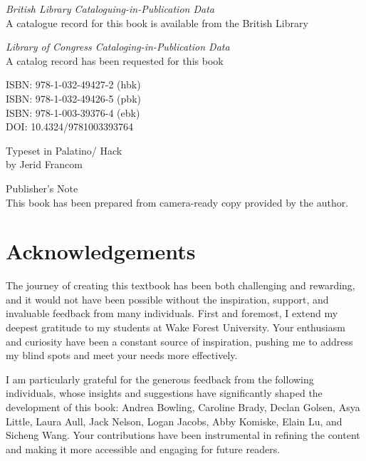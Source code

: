 \documentclass[
  letterpaper,
  krantz1]{latex/krantz-mod}
\renewcommand*\contentsname{Table of contents}
\newcommand\contentsname{Table of contents}
\theoremstyle{definition}
\theoremstyle{definition}
\theoremstyle{remark}
\begin{document}
\textit{British Library Cataloguing-in-Publication Data}\\
A catalogue record for this book is available from the British Library

\textit{Library of Congress Cataloging-in-Publication Data}\\
A catalog record has been requested for this book

ISBN: 978-1-032-49427-2 (hbk)\\
ISBN: 978-1-032-49426-5 (pbk)\\
ISBN: 978-1-003-39376-4 (ebk)\\

DOI: 10.4324/9781003393764

Typeset in Palatino/ Hack\\
by Jerid Francom\\

\vspace{.5cm}

Publisher's Note\\
This book has been prepared from camera-ready copy provided by the author.

\renewcommand*\contentsname{Contents}
{
\setcounter{tocdepth}{2}
\tableofcontents
}

\chapter*{Acknowledgements}\label{sec-acknowledgements-pdf}


The journey of creating this textbook has been both challenging and
rewarding, and it would not have been possible without the inspiration,
support, and invaluable feedback from many individuals. First and
foremost, I extend my deepest gratitude to my students at Wake Forest
University. Your enthusiasm and curiosity have been a constant source of
inspiration, pushing me to address my blind spots and meet your needs
more effectively.

I am particularly grateful for the generous feedback from the following
individuals, whose insights and suggestions have significantly shaped
the development of this book: Andrea Bowling, Caroline Brady, Declan
Golsen, Asya Little, Laura Aull, Jack Nelson, Logan Jacobs, Abby
Komiske, Elain Lu, and Sicheng Wang. Your contributions have been
instrumental in refining the content and making it more accessible and
engaging for future readers.
\end{document}
